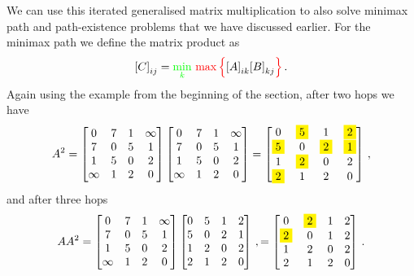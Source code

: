 We can use this iterated generalised matrix multiplication to also solve minimax
path and path-existence problems that we have discussed earlier. For the minimax
path we define the matrix product as
\begin{equation*}
  {[C]}_{ij} = {\color{green}\min_k}\ {\color{red}\max\Big\{}{[A]}_{ik} {[B]}_{kj}{\color{red}\Big\}}\,.
\end{equation*}
Again using the example from the beginning of the section, after two hops we
have
\begin{equation*}
  A^2 =
  \begin{bmatrix}    
    0 & 7 & 1 & \infty \\
    7 & 0 & 5 & 1 \\
    1 & 5 & 0 & 2 \\
    \infty & 1 & 2 & 0
  \end{bmatrix}
  \begin{bmatrix}    
    0 & 7 & 1 & \infty \\
    7 & 0 & 5 & 1 \\
    1 & 5 & 0 & 2 \\
    \infty & 1 & 2 & 0
  \end{bmatrix}
  =
  \begin{bmatrix}    
    0 & \colorbox{yellow}{5} & 1 & \colorbox{yellow}{2} \\
    \colorbox{yellow}{5} & 0 & \colorbox{yellow}{2} & \colorbox{yellow}{1} \\
    1 & \colorbox{yellow}{2} & 0 & 2 \\
    \colorbox{yellow}{2} & 1 & 2 & 0
  \end{bmatrix}\,,
\end{equation*}
and after three hops
\begin{equation*}
  AA^2 =
  \begin{bmatrix}    
    0 & 7 & 1 & \infty \\
    7 & 0 & 5 & 1 \\
    1 & 5 & 0 & 2 \\
    \infty & 1 & 2 & 0
  \end{bmatrix}
  \begin{bmatrix}    
    0 & {5} & 1 & {2} \\
    {5} & 0 & {2} & {1} \\
    1 & {2} & 0 & 2 \\
    {2} & 1 & 2 & 0
  \end{bmatrix}\,, =
  \begin{bmatrix}    
    0 & \colorbox{yellow}{2} & 1 & 2 \\
    \colorbox{yellow}{2} & 0 & {1} & {2} \\
    1 & {2} & 0 & 2 \\
    {2} & 1 & 2 & 0
  \end{bmatrix}\,.
\end{equation*}
